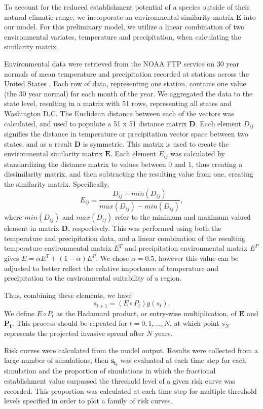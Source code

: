 \documentclass[12pt]{article}
\begin{document}
To account for the reduced establishment potential of a species outside of their natural climatic range, we incorporate an environmental similarity matrix $\boldsymbol{E}$ into our model. For this preliminary model, we utilize a linear combination of two environmental variates, temperature and precipitation, when calculating the similarity matrix.

Environmental data were retrieved from the NOAA FTP service on 30 year normals of mean temperature and precipitation recorded at stations across the United States \citep{NOAA}. Each row of data, representing one station, contains one value (the 30 year normal) for each month of the year. We aggregated the data to the state level, resulting in a matrix with 51 rows, representing all states and Washington D.C. The Euclidean distance between each of the vectors was calculated, and used to populate a 51 x 51 distance matrix $\boldsymbol{D}$. Each element $D_{ij}$ signifies the distance in temperature or precipitation vector space between two states, and as a result $\boldsymbol{D}$ is symmetric. This matrix is used to create the environmental similarity matrix $\boldsymbol{E}$. Each element $E_{ij}$ was calculated by standardizing the distance matrix to values between 0 and 1, thus creating a dissimilarity matrix, and then subtracting the resulting value from one, creating the similarity matrix. Specifically,
\[
   E_{ij} = \frac{D_{ij} - min\left(D_{ij}\right)}{max\left(D_{ij}\right) - min\left(D_{ij}\right)},
\]
where $min(D_{ij})$ and $max(D_{ij})$ refer to the minimum and maximum valued element in matrix $\boldsymbol{D}$, respectively.  This was performed using both the temperature and precipitation data, and a linear combination of the resulting temperature environmental matrix $E^{T}$ and precipitation environmental matrix $E^{P}$ gives $E = \alpha E^{T} + (1-\alpha) E^{P}$.  We chose $\alpha = 0.5$, however this value can be adjusted to better reflect the relative importance of temperature and precipitation to the environmental suitability of a region.

Thus, combining these elements, we have
\[
	s_{t+1} = (E  \circ P_t) g(s_t).
\]
We define $E \circ P_t$ as the Hadamard product, or entry-wise multiplication, of $\boldsymbol{E}$ and $\boldsymbol{P_t}$.  This process should be repeated for $t=0,1,...,N$, at which point $s_N$ represents the projected invasive spread after $N$ years. 

Risk curves were calculated from the model output. Results were collected from a large number of simulations, then $\boldsymbol{s_{t_i}}$ was evaluated at each time step for each simulation and the proportion of simulations in which the fractional establishment value surpassed the threshold level of a given risk curve was recorded. This proportion was calculated at each time step for multiple threshold levels specified in order to plot a family of risk curves.
\end{document}
